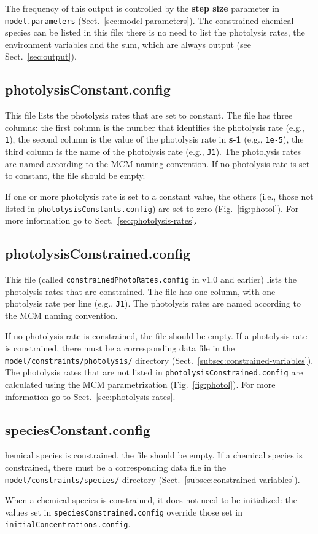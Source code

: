 The frequency of this output is controlled by the \textbf{step size}
parameter in \texttt{model.parameters} (Sect.~\ref{sec:model-parameters}).
The constrained chemical species can be listed in this file; there is
no need to list the photolysis rates, the environment variables and
the  sum, which are always output (see Sect.~\ref{sec:output}).

\subsection{photolysisConstant.config} \label{subsec:photolysisconstant}

This file lists the photolysis rates that are set to constant. The file has
three columns: the first column is the number that identifies the
photolysis rate (e.g., \texttt{1}), the second column is the value of
the photolysis rate in \textbf{s-1} (e.g., \texttt{1e-5}), the third
column is the name of the photolysis rate (e.g., \texttt{J1}). The
photolysis rates are named according to the MCM
\href{http://mcm.leeds.ac.uk/MCM/parameters/photolysis.htt}{naming convention}.
If no photolysis rate is set to constant, the file should be empty.

If one or more photolysis rate is set to a constant value, the others
(i.e., those not listed in \texttt{photolysisConstants.config}) are
set to zero (Fig.~\ref{fig:photol}). For more information go to
Sect.~\ref{sec:photolysis-rates}.

\subsection{photolysisConstrained.config} \label{subsec:photolysisconstrained}

This file (called \texttt{constrainedPhotoRates.config} in v1.0 and
earlier) lists the photolysis rates that are constrained. The file has
one column, with one photolysis rate per line (e.g., \texttt{J1}). The
photolysis rates are named according to the MCM
\href{http://mcm.leeds.ac.uk/MCM/parameters/photolysis.htt}{naming convention}.

If no photolysis rate is constrained, the file should be empty. If a
photolysis rate is constrained, there must be a corresponding data
file in the \texttt{model/constraints/photolysis/} directory
(Sect.~\ref{subsec:constrained-variables}). The photolysis rates that
are not listed in \texttt{photolysisConstrained.config} are calculated
using the MCM parametrization (Fig.~\ref{fig:photol}). For more
information go to Sect.~\ref{sec:photolysis-rates}.

\subsection{speciesConstant.config} \label{subsec:speciesconstant}
hemical species is
constrained, the file should be empty. If a chemical species is
constrained, there must be a corresponding data file in the
\texttt{model/constraints/species/} directory
(Sect.~\ref{subsec:constrained-variables}).

When a chemical species is constrained, it does not need to be
initialized: the values set in \texttt{speciesConstrained.config}
override those set in \texttt{initialConcentrations.config}.

